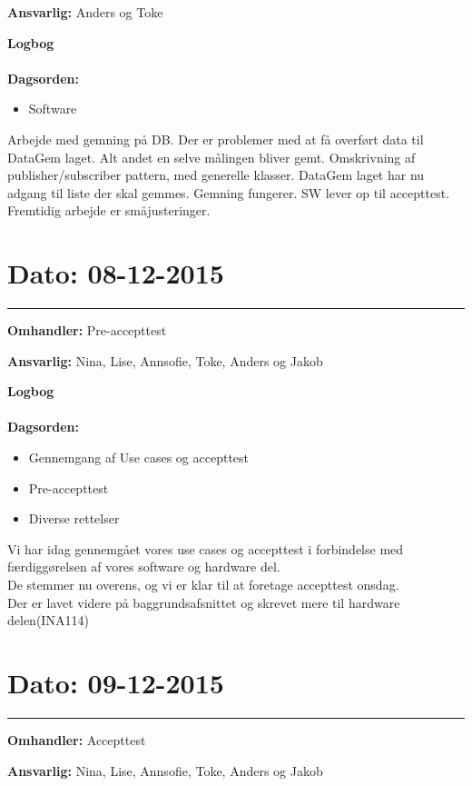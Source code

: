 \textbf{Ansvarlig:} Anders og Toke

\textbf{Logbog}
\\
\\
\textbf{Dagsorden:}
\begin{itemize}
	\item Software
\end{itemize}

Arbejde med gemning på DB. Der er problemer med at få overført data til DataGem laget. Alt andet en selve målingen bliver gemt. 
Omskrivning af publisher/subscriber pattern, med generelle klasser. DataGem laget har nu adgang til liste der skal gemmes. Gemning fungerer.
SW lever op til accepttest. Fremtidig arbejde er småjusteringer.
	
	
\section{Dato: 08-12-2015 }
\hrule

\textbf{Omhandler:} Pre-accepttest

\textbf{Ansvarlig:} Nina, Lise, Annsofie, Toke, Anders og Jakob

\textbf{Logbog}
\\
\\
\textbf{Dagsorden:}
\begin{itemize}
	\item Gennemgang af Use cases og accepttest
	\item Pre-accepttest 
	\item Diverse rettelser
\end{itemize}

Vi har idag gennemgået vores use cases og accepttest i forbindelse med færdiggørelsen af vores software og hardware del. \\
De stemmer nu overens, og vi er klar til at foretage accepttest onsdag.\\
Der er lavet videre på baggrundsafsnittet og skrevet mere til hardware delen(INA114)

	
	
	
\section{Dato: 09-12-2015 }
\hrule

\textbf{Omhandler:} Accepttest

\textbf{Ansvarlig:} Nina, Lise, Annsofie, Toke, Anders og Jakob

